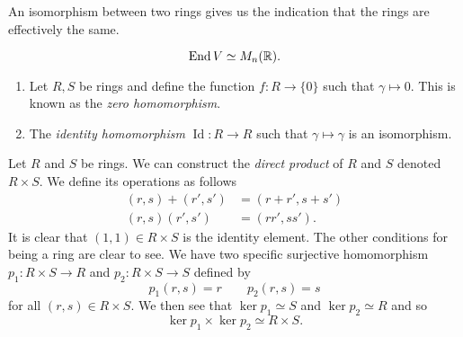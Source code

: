 \begin{remark}
    An isomorphism between two rings gives us the indication that the rings are effectively the same.
\end{remark}

\begin{example}
    \[ \operatorname{End}{V} \simeq M_n(\mathbb{R}). \]
\end{example}

\begin{example}
    \begin{enumerate}
        \item Let $R,S$ be rings and define the function $f: R \to \{0\}$ such that $\gamma \mapsto 0$. This is known as the \emph{zero homomorphism}.
        \item The \emph{identity homomorphism} $\operatorname{Id}: R \to R$ such that $\gamma \mapsto \gamma$ is an isomorphism.
    \end{enumerate}
\end{example}

\begin{example}
    Let $R$ and $S$ be rings. We can construct the \emph{direct product} of $R$ and $S$ denoted $R \times S$. We define its operations as follows
    \begin{align*}
        (r, s) + (r', s') &= (r + r', s + s') \\
        (r, s)(r',s')     &= (rr', ss').
    \end{align*}
    It is clear that $(1, 1) \in R \times S$ is the identity element. The other conditions for being a ring are clear to see. We have two specific surjective homomorphism $p_1: R \times S \to R$ and $p_2: R \times S \to S$ defined by
    \[ p_1(r, s) = r \qquad p_2(r, s) = s \]
    for all $(r, s) \in R \times S$. We then see that $\ker{p_1} \simeq S$ and $\ker{p_2} \simeq R$ and so
    \[ \ker{p_1} \times \ker{p_2} \simeq R \times S. \]
\end{example}
